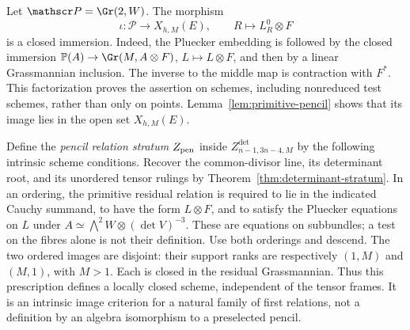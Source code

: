 \documentclass[11pt,reqno]{amsart}
\numberwithin{equation}{section}
\theoremstyle{definition}\newtheorem{definition}[theorem]{Definition}
\theoremstyle{remark}\newtheorem{remark}[theorem]{Remark}
\newcommand{\Pj}{\mathbb P}\newcommand{\A}{\mathbb A}
\begin{document}
Let \(\mathscr P=\Gr(2,W)\).  The morphism
\begin{equation}\label{eq:primitive-pencil-embedding}
 \iota:\mathscr P\longrightarrow X_{h,M}(E),
                 \qquad R\longmapsto L_R^0\otimes F
\end{equation}
is a closed immersion.  Indeed, the Pluecker embedding is followed
by the closed immersion \(\Pj(A)\to\Gr(M,A\otimes F)\),
\(L\mapsto L\otimes F\), and then by a linear Grassmannian
inclusion.  The inverse to the middle map is contraction with
\(F^*\).  This factorization proves the assertion on schemes,
including nonreduced test schemes, rather than only on points.
Lemma~\ref{lem:primitive-pencil} shows that its image lies in the
open set \(X_{h,M}(E)\).

Define the \emph{pencil relation stratum} \(Z_{\rm pen}\) inside
\(Z^{\det}_{n-1,3n-4,M}\) by the following intrinsic scheme
conditions.  Recover the common-divisor line, its determinant root,
and its unordered tensor rulings by
Theorem~\ref{thm:determinant-stratum}.  In an ordering, the primitive
residual relation is required to lie in the indicated Cauchy
summand, to have the form \(L\otimes F\), and to satisfy the
Pluecker equations on \(L\) under
\(A\simeq\bigwedge^2W\otimes(\det V)^{-3}\).
These are equations on subbundles; a test on the fibres alone is
not their definition.  Use both orderings and descend.  The two
ordered images are disjoint: their support ranks are respectively
\((1,M)\) and \((M,1)\), with \(M>1\).  Each is closed in the
residual Grassmannian.  Thus this prescription defines a locally
closed scheme, independent of the tensor frames.  It is an
intrinsic image criterion for a natural family of first relations,
not a definition by an algebra isomorphism to a preselected pencil.
\end{document}
